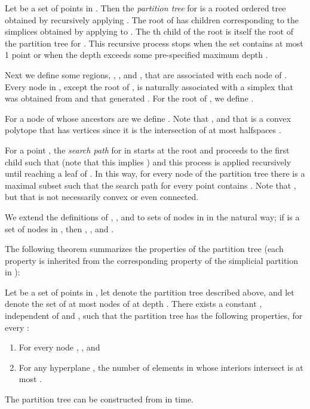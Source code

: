 \documentclass{patmorin}
\begin{document}
Let  be a set of  points in . Then the \emph{partition
tree}  for  is a rooted ordered tree obtained by recursively
applying .  The root of  has  children
corresponding to the simplices  obtained
by applying  to . The th child of the
root is itself the root of the partition tree 
for . This recursive process stops when the set 
contains at most 1 point or when the depth exceeds some pre-specified
maximum depth .

Next we define some regions, , , and ,
that are associated with each node  of .  Every node  in
, except the root of , is naturally associated with a simplex
 that was obtained from  and that
generated .  For the root of , we define .

For a node  of  whose ancestors are 
we define .  Note that
, and that  is a convex polytope
that has  vertices since
it is the intersection of at most  halfspaces \cite{m70}.

For a point , the \emph{search path} for  in  starts
at the root and proceeds to the first child  such that 
(note that this implies ) and this process is applied
recursively until reaching a leaf of .  In this way, for every node
 of the partition tree there is a maximal subset  such that the search path for every point  contains .
Note that , but that 
is not necessarily convex or even connected.

We extend the definitions of , , and  to sets of
nodes in  in the natural way; if  is a set of nodes in ,
then , , and
.

The following theorem summarizes the properties of the partition tree
 \cite{m92} (each property is inherited from the corresponding
property of the simplicial partition in
):

\begin{thm}
  Let  be a set of  points in , let  denote the partition
  tree described above, and let  denote the set of at most 
  nodes of  at depth .  There exists a constant , independent
  of  and , such that the partition tree  has the following
  properties, for every :
  \begin{enumerate}
    \item For every node , , and 
    \item For any hyperplane , the number of elements in
       whose interiors intersect  is at most
      .
    \end{enumerate}
    The partition tree  can be constructed from  in
     time.
\end{thm}
\end{document}
